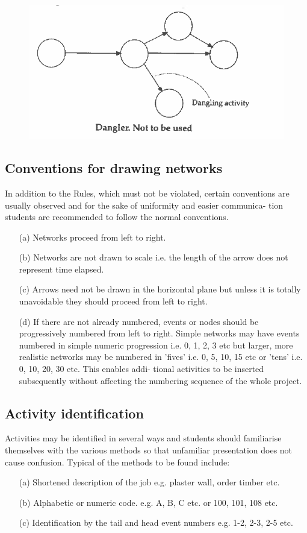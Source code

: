 \documentclass[]{report}
\begin{document}
\begin{figure}[h!]
\centering
\includegraphics[width=0.4\linewidth]{325-a}
\caption{}
\label{fig:325-a}
\end{figure}

\subsection*{Conventions for drawing networks }
In addition to the Rules, which must not be violated, certain 
conventions are usually observed and for the sake of uniformity and easier communica-
tion students are recommended to follow the normal conventions. 
\begin{itemize}
	\item[(a)] Networks proceed from left to right. 
	\item[(b)]  Networks are not drawn to scale i.e. the length of the arrow does not represent time 
elapsed. 
	\item[(c)]  Arrows need not be drawn in the horizontal plane but unless it is totally unavoidable 
they should proceed from left to right. 
	\item[(d)]  If there are not already numbered, events or nodes should be progressively 
numbered from left to right. Simple networks may have events numbered in simple 
numeric progression i.e. 0, 1, 2, 3 etc but larger, more realistic networks may be 
numbered in 'fives' i.e. 0, 5, 10, 15 etc or 'tens' i.e. 0, 10, 20, 30 etc. This enables addi-
tional activities to be inserted subsequently without affecting the numbering 
sequence of the whole project. 
\end{itemize}
\subsection*{Activity identification }
Activities may be identified in several ways and students should familiarise themselves 
with the various methods so that unfamiliar presentation does not cause confusion. 
Typical of the methods to be found include: 
\begin{itemize}
\item[(a)]  Shortened description of the job e.g. plaster wall, order timber etc. 
\item[(b)]  Alphabetic or numeric code. e.g. A, B, C etc. or 100, 101, 108 etc. 
\item[(c)]  Identification by the tail and head event numbers e.g. 1-2, 2-3, 2-5 etc. 
\end{itemize}
\end{document}
